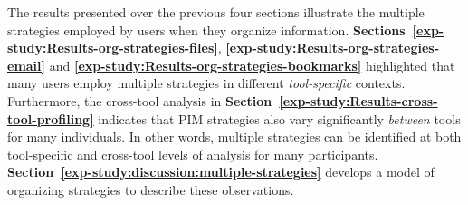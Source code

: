 The results presented over the previous four sections illustrate the multiple strategies employed by users when they organize information.  \textbf{Sections~\ref{exp-study:Results-org-strategies-files}}, \textbf{\ref{exp-study:Results-org-strategies-email}} and \textbf{\ref{exp-study:Results-org-strategies-bookmarks}} highlighted that many users employ multiple strategies in different \textit{tool-specific} contexts.  Furthermore, the cross-tool analysis in \textbf{Section~\ref{exp-study:Results-cross-tool-profiling}} indicates that PIM strategies also vary significantly \textit{between} tools for many individuals.  In other words, multiple strategies can be identified at both tool-specific and cross-tool levels of analysis for many participants.  \textbf{Section~\ref{exp-study:discussion:multiple-strategies}} develops a model of organizing strategies to describe these observations.













